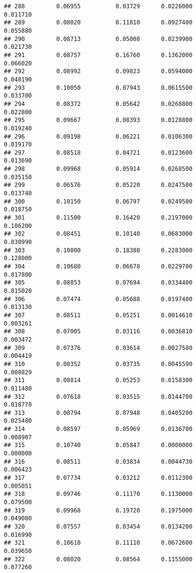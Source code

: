 \documentclass[
]{article}
\begin{document}
\begin{verbatim}
## 288         0.06955          0.03729      0.0226000            0.011710
## 289         0.08020          0.11810      0.0927400            0.055880
## 290         0.08713          0.05008      0.0239900            0.021730
## 291         0.08757          0.16760      0.1362000            0.066020
## 292         0.08992          0.09823      0.0594000            0.048190
## 293         0.10050          0.07943      0.0615500            0.033700
## 294         0.08372          0.05642      0.0268800            0.022800
## 295         0.09667          0.08393      0.0128800            0.019240
## 296         0.09198          0.06221      0.0106300            0.019170
## 297         0.08518          0.04721      0.0123600            0.013690
## 298         0.09968          0.05914      0.0268500            0.035150
## 299         0.06576          0.05220      0.0247500            0.013740
## 300         0.10150          0.06797      0.0249500            0.018750
## 301         0.11500          0.16420      0.2197000            0.106200
## 302         0.08451          0.10140      0.0683000            0.030990
## 303         0.10800          0.18380      0.2283000            0.128000
## 304         0.10680          0.06678      0.0229700            0.017800
## 305         0.08853          0.07694      0.0334400            0.015020
## 306         0.07474          0.05688      0.0197400            0.013130
## 307         0.08511          0.05251      0.0014610            0.003261
## 308         0.07005          0.03116      0.0036810            0.003472
## 309         0.07376          0.03614      0.0027580            0.004419
## 310         0.08352          0.03735      0.0045590            0.008829
## 311         0.08814          0.05253      0.0158300            0.011480
## 312         0.07618          0.03515      0.0144700            0.018770
## 313         0.08794          0.07948      0.0405200            0.025480
## 314         0.08597          0.05969      0.0136700            0.008907
## 315         0.10740          0.05847      0.0000000            0.000000
## 316         0.08511          0.03834      0.0044730            0.006423
## 317         0.07734          0.03212      0.0112300            0.005051
## 318         0.09746          0.11170      0.1130000            0.079500
## 319         0.09968          0.19720      0.1975000            0.049080
## 320         0.07557          0.03454      0.0134200            0.016990
## 321         0.10610          0.11110      0.0672600            0.039650
## 322         0.08020          0.08564      0.1155000            0.077260

\end{verbatim}
\end{document}
